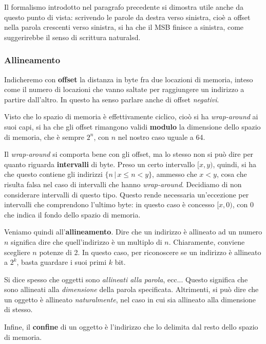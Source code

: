 \documentclass[a4paper,11pt]{article}
\begin{document}
Il formalismo introdotto nel paragrafo precedente si dimostra utile anche da questo punto di vista: scrivendo le parole da destra verso sinistra, cioè a offset nella parola crescenti verso sinistra, si ha che il MSB finisce a sinistra, come suggerirebbe il senso di scrittura naturalsd.

\subsubsection{Allineamento}
Indicheremo con \textbf{offset} la distanza in byte fra due locazioni di memoria, inteso come il numero di locazioni che vanno saltate per raggiungere un indirizzo a partire dall'altro.
In questo ha senso parlare anche di offset \textit{negativi}.

Visto che lo spazio di memoria è effettivamente ciclico, cioò si ha \textit{wrap-around} ai suoi capi, si ha che gli offset rimangono validi \textbf{modulo} la dimensione dello spazio di memoria, che è sempre $2^n$, con $n$ nel nostro caso uguale a 64.

Il \textit{wrap-around} si comporta bene con gli offset, ma lo stesso non si può dire per quanto riguarda \textbf{intervalli} di byte.
Preso un certo intervallo $[x, y)$, quindi, si ha che questo contiene gli indirizzi $\{n \, | \, x \leq n < y\}$, ammesso che $x < y$, cosa che risulta falsa nel caso di intervalli che hanno \textit{wrap-around}. 
Decidiamo di non considerare intervalli di questo tipo.
Questo rende necessaria un'eccezione per intervalli che comprendono l'ultimo byte: in questo caso è concesso $[x, 0)$, con 0 che indica il fondo dello spazio di memoria.

Veniamo quindi all'\textbf{allineamento}.
Dire che un indirizzo è allineato ad un numero $n$ significa dire che quell'indirizzo è un multiplo di $n$.
Chiaramente, conviene scegliere $n$ potenze di 2.
In questo caso, per riconoscere se un indirizzo è allineato a $2^k$, basta guardare i suoi primi $k$ bit.

Si dice spesso che oggetti sono \textit{allineati alla parola}, ecc...
Questo significa che sono allineati alla \textit{dimensione} della parola specificata.
Altrimenti, si può dire che un oggetto è allineato \textit{naturalmente}, nel caso in cui sia allineato alla dimensione di stesso.

Infine, il \textbf{confine} di un oggetto è l'indirizzo che lo delimita dal resto dello spazio di memoria.
\end{document}
